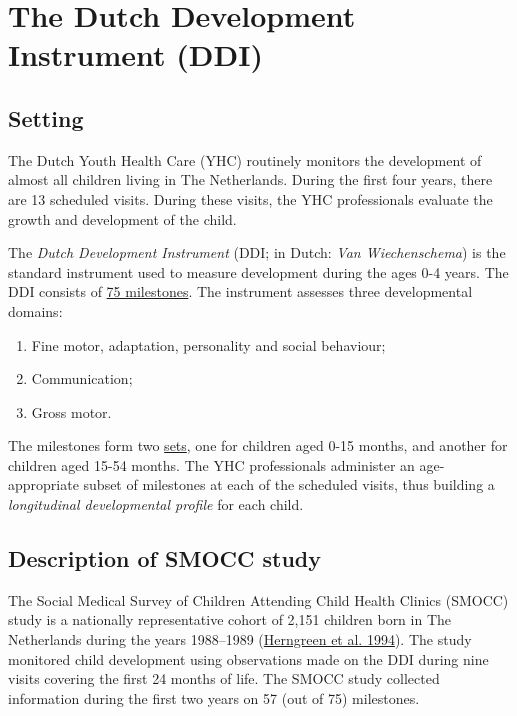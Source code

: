 \documentclass[
]{book}
\providecommand{\tightlist}{%
  \setlength{\itemsep}{0pt}\setlength{\parskip}{0pt}}
\begin{document}
\hypertarget{sec:ddi}{%
\section{The Dutch Development Instrument (DDI)}\label{sec:ddi}}

\hypertarget{setting}{%
\subsection{Setting}\label{setting}}

The Dutch Youth Health Care (YHC) routinely monitors the development of almost all children living in The Netherlands. During the first four years, there are 13 scheduled visits. During these visits, the YHC professionals evaluate the growth and development of the child.

The \emph{Dutch Development Instrument} (DDI; in Dutch: \emph{Van Wiechenschema}) is the standard instrument used to measure development during the ages 0-4 years. The DDI consists of \href{https://www.ncj.nl/van-wiechen/kenmerken/}{75 milestones}. The instrument assesses three developmental domains:

\begin{enumerate}
\def\labelenumi{\arabic{enumi}.}
\tightlist
\item
  Fine motor, adaptation, personality and social behaviour;
\item
  Communication;
\item
  Gross motor.
\end{enumerate}

The milestones form two \href{https://www.ggdghorkennisnet.nl/?file=656\&m=1310474916\&action=file.download}{sets}, one for children aged 0-15 months, and another for children aged 15-54 months. The YHC professionals administer an age-appropriate subset of milestones at each of the scheduled visits, thus building a \emph{longitudinal developmental profile} for each child.

\hypertarget{sec:smocc}{%
\subsection{Description of SMOCC study}\label{sec:smocc}}

The Social Medical Survey of Children Attending Child Health Clinics (SMOCC) study is a nationally representative cohort of 2,151 children born in The Netherlands during the years 1988--1989 (\protect\hyperlink{ref-herngreen1994}{Herngreen et al. 1994}). The study monitored child development using observations made on the DDI during nine visits covering the first 24 months of life. The SMOCC study collected information during the first two years on 57 (out of 75) milestones.
\end{document}
